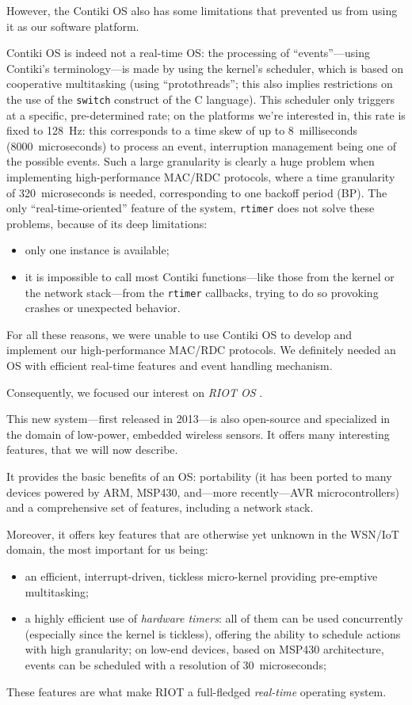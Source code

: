 \documentclass[a4paper,twoside]{article}
\begin{document}
\bigskip

However, the Contiki OS also has some limitations that prevented us from
using it as our software platform.

Contiki OS is indeed not a real-time OS: the processing of ``events''---using
Contiki's terminology---is made by using the kernel's scheduler, which is
based on cooperative multitasking (using ``protothreads''; this also implies
restrictions on the use of the \texttt{switch} construct of the C language).
This scheduler only triggers at a specific, pre-determined rate; on
the platforms we're interested in, this rate is fixed to 128~Hz:
this corresponds to a time skew of up to 8~milliseconds
(8000~microseconds) to process an event, interruption management being
one of the possible events. Such a large granularity is clearly
a huge problem when implementing high-performance MAC/RDC protocols,
where a time granularity of 320~microseconds is needed, corresponding
to one backoff period (BP). The only ``real-time-oriented'' feature
of the system, \texttt{rtimer} does not solve these problems, because
of its deep limitations:
\begin{itemize}
\item only one instance is available;
\item it is impossible to call most Contiki functions---like those from
the kernel or the network stack---from the \texttt{rtimer} callbacks,
trying to do so provoking crashes or unexpected behavior.
\end{itemize}

For all these reasons, we were unable to use Contiki OS to develop and
implement our high-performance MAC/RDC protocols. We definitely needed
an OS with efficient real-time features and event handling mechanism.

\bigskip

Consequently, we focused our interest on \emph{RIOT OS} \cite{RIOT}.

This new system---first released in 2013---is also open-source and
specialized in the domain of low-power, embedded wireless sensors.
It offers many interesting features, that we will now describe.

It provides the basic benefits of an OS: portability (it has been ported
to many devices powered by ARM, MSP430, and---more recently---AVR
microcontrollers) and a comprehensive set of features, including
a network stack.

Moreover, it offers key features that are otherwise yet unknown in
the WSN/IoT domain, the most important for us being:
\begin{itemize}
\item an efficient, interrupt-driven, tickless micro-kernel providing
      pre-emptive multitasking;
\item a highly efficient use of \emph{hardware timers}: all of them can be
      used concurrently (especially since the kernel is tickless), offering
      the ability to schedule actions with high granularity; on low-end
      devices, based on MSP430 architecture, events can be scheduled
      with a resolution of 30~microseconds;
\end{itemize}
These features are what make RIOT a full-fledged \emph{real-time} operating
system.
\end{document}
